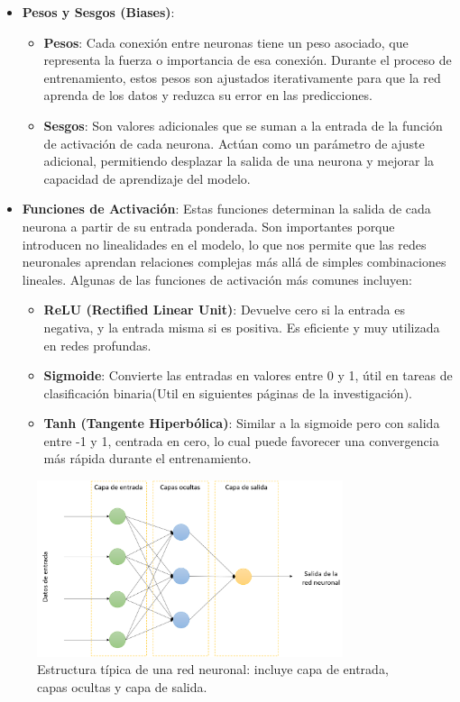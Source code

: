 \documentclass[11pt]{article} %
\begin{document}
\begin{itemize}
   \item\textbf{Pesos y Sesgos (Biases)}:
    \begin{itemize}
        \item \textbf{Pesos}: Cada conexión entre neuronas tiene un peso asociado, que representa la fuerza o importancia de esa conexión. Durante el proceso de entrenamiento, estos pesos son ajustados iterativamente para que la red aprenda de los datos y reduzca su error en las predicciones.
        \item \textbf{Sesgos}: Son valores adicionales que se suman a la entrada de la función de activación de cada neurona. Actúan como un parámetro de ajuste adicional, permitiendo desplazar la salida de una neurona y mejorar la capacidad de aprendizaje del modelo.
    \end{itemize}
    \item \textbf{Funciones de Activación}: Estas funciones determinan la salida de cada neurona a partir de su entrada ponderada. Son importantes porque introducen no linealidades en el modelo, lo que nos permite que las redes neuronales aprendan relaciones complejas más allá de simples combinaciones lineales. Algunas de las funciones de activación más comunes incluyen:
    \begin{itemize}
        \item \textbf{ReLU (Rectified Linear Unit)}: Devuelve cero si la entrada es negativa, y la entrada misma si es positiva. Es eficiente y muy utilizada en redes profundas.
        \item \textbf{Sigmoide}: Convierte las entradas en valores entre 0 y 1, útil en tareas de clasificación binaria(Util en siguientes páginas de la investigación).    
        \item \textbf{Tanh (Tangente Hiperbólica)}: Similar a la sigmoide pero con salida entre -1 y 1, centrada en cero, lo cual puede favorecer una convergencia más rápida durante el entrenamiento.
    \end{itemize}
\end{itemize}
\begin{figure}[H]
    \centering
    \includegraphics[width=0.8\textwidth]{Images/tutorial_ml_0215.png}
    \caption{Estructura típica de una red neuronal: incluye capa de entrada, capas ocultas y capa de salida.}
    \label{fig:estructura-red-neuronal}
\end{figure}
\end{document}

